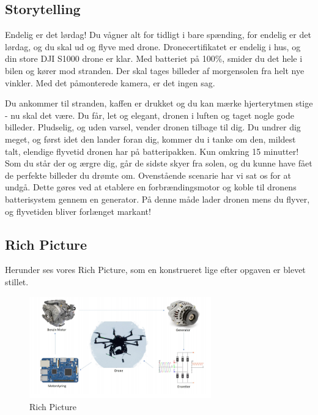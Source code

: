 \subsection{Storytelling}
\label{sec:storytelling-}

Endelig er det lørdag! Du vågner alt for tidligt i bare spænding, for endelig er det lørdag, og du skal ud og flyve med drone. Dronecertifikatet er endelig i hus, og din store DJI S1000 drone er klar. Med batteriet på 100\%, smider du det hele i bilen og kører mod stranden. Der skal tages billeder af morgensolen fra helt nye vinkler. Med det påmonterede kamera, er det ingen sag.

Du ankommer til stranden, kaffen er drukket og du kan mærke hjerterytmen stige - nu skal det være. Du får, let og elegant, dronen i luften og taget nogle gode billeder. Pludselig, og uden varsel, vender dronen tilbage til dig. Du undrer dig meget, og først idet den lander foran dig, kommer du i tanke om den, mildest talt, elendige flyvetid dronen har på batteripakken. Kun omkring 15 minutter! Som du står der og ærgre dig, går de sidste skyer fra solen, og du kunne have fået de perfekte billeder du drømte om. 
Ovenstående scenarie har vi sat os for at undgå. Dette gøres ved at etablere en forbrændingsmotor og koble til dronens batterisystem gennem en generator. På denne måde lader dronen mens du flyver, og flyvetiden bliver forlænget markant!

\subsection{Rich Picture}
\label{sec:rich-picture-}

Herunder ses vores Rich Picture, som en konstrueret lige efter opgaven er blevet stillet.

\begin{figure}[h]
  \centering
  \includegraphics[width=0.7\textwidth]{./figurer/int1.png}
  \caption{Rich Picture}
  \label{fig:int1}
\end{figure}

